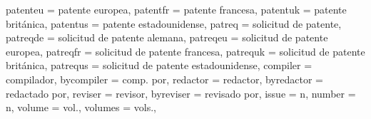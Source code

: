 {patenteu         = {patente europea},
patentfr         = {patente francesa},
patentuk         = {patente británica},
patentus         = {patente estadounidense},
patreq           = {solicitud de patente},
patreqde         = {solicitud de patente alemana},
patreqeu         = {solicitud de patente europea},
patreqfr         = {solicitud de patente francesa},
patrequk         = {solicitud de patente británica},
patrequs         = {solicitud de patente estadounidense},
compiler       = {compilador},
bycompiler       = {comp\adddotspace por},
redactor         = {redactor},
byredactor       = {redactado por},
reviser          = {revisor},
byreviser        = {revisado por},
issue            = {n},
number           = {n},
volume           = {vol\adddot},
volumes          = {vols\adddot},
}

\makeatletter
{}
\makeatother

\makeatletter
{}
\makeatother
